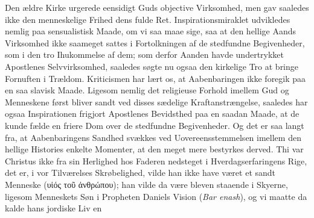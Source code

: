 \documentclass[12pt]{book}
\newcommand{\opage}[1]{\marginnote{\footnotesize\textit{[#1]}}}
\begin{document}
Den ældre Kirke urgerede eensidigt Guds objective Virksomhed, men gav saaledes
ikke den menneskelige Frihed dens fulde Ret. Inspirationsmiraklet udvikledes
nemlig paa sensualistisk Maade, om vi saa maae sige, saa at den hellige Aands
Virksomhed ikke saameget sattes i Fortolkningen af de
\opage{159} %
stedfundne Begivenheder, som i den tro Ihukommelse af dem; som derfor Aanden
havde undertrykket Apostlenes Selvvirksomhed, saaledes søgte nu ogsaa den
kirkelige Tro at bringe Fornuften i Trældom. Kriticismen har lært os, at
Aabenbaringen ikke foregik paa en saa slavisk Maade. Ligesom nemlig det
religieuse Forhold imellem Gud og Menneskene først bliver sandt ved disses
sædelige Kraftanstrængelse, saaledes har ogsaa Inspirationen frigjort Apostlenes
Bevidsthed paa en saadan Maade, at de kunde fælde en friere Dom over de
stedfundne Begivenheder. Og det er saa langt fra, at Aabenbaringens Sandhed
svækkes ved Uovereensstemmelsen imellem den hellige Histories enkelte Momenter,
at den meget mere bestyrkes derved. Thi var Christus ikke fra sin Herlighed hos
Faderen nedsteget i Hverdagserfaringens Rige, det er, i vor Tilværelses
Skrøbelighed, vilde han ikke have været et sandt Menneske (υἱός τοῦ ἀνθρώπου);
han vilde da være bleven staaende i Skyerne, ligesom Menneskets Søn i Propheten
Daniels Vision (\emph{Bar enash}), og vi maatte da kalde hans jordiske Liv en
\end{document}
